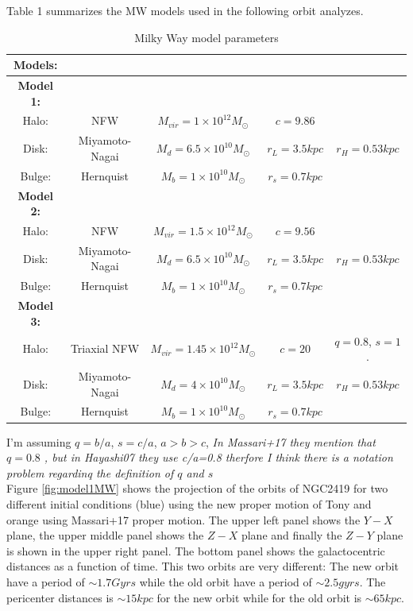\documentclass[14pt]{article}
\begin{document}
Table 1 summarizes the MW models used in the following orbit analyzes.

\begin{table}[H]
\centering
\begin{tabular}{c c c c c}
\hline
\hline
\textbf{Models:} & & & & \\
\hline
\textbf{Model 1:} & & & & \\
Halo: & NFW & $M_{vir} = 1\times 10^{12} M_{\odot}$ & $c=9.86$  \\
Disk: & Miyamoto-Nagai & $M_{d} = 6.5\times10^{10} M_{\odot}$ & $r_L = 3.5 kpc$ & $r_H = 0.53 kpc$ \\
Bulge: & Hernquist & $M_b = 1 \times 10^{10} M_{\odot}$ & $r_s=0.7 kpc$ & \\
\hline
\textbf{Model 2:} & & & & \\
Halo: & NFW & $M_{vir} = 1.5\times 10^{12} M_{\odot}$ & $c=9.56$  \\
Disk: & Miyamoto-Nagai & $M_{d} = 6.5\times10^{10} M_{\odot}$ & $r_L = 3.5 kpc$ & $r_H = 0.53 kpc$ \\
Bulge: & Hernquist & $M_b = 1 \times 10^{10} M_{\odot}$ & $r_s=0.7 kpc$ & \\
\hline
\textbf{Model 3:} & & & & \\
Halo: & Triaxial NFW & $M_{vir} = 1.45\times 10^{12} M_{\odot}$ &
$c=20$  & $q=0.8$, $s=1$. \\
Disk: & Miyamoto-Nagai & $M_{d} = 4\times10^{10} M_{\odot}$ & $r_L = 3.5 kpc$ & $r_H = 0.53 kpc$ \\
Bulge: & Hernquist & $M_b = 1 \times 10^{10} M_{\odot}$ & $r_s=0.7 kpc$ & \\
\hline
\hline
\end{tabular}
\caption{Milky Way model parameters}
\end{table}

I'm assuming $q=b/a$, $s=c/a$, $a>b>c$, \textit{In Massari+17 they
mention that $q=0.8$ , but in Hayashi07 they use c/a=0.8 therfore I
think there is a notation problem regardinq the definition of $q$ and
$s$ }\\

Figure \ref{fig:model1MW} shows the projection of the orbits of
NGC2419 for two different initial conditions (blue) using the new
proper motion of Tony and orange using Massari+17 proper motion.
The upper left panel shows the $Y-X$ plane, the upper middle panel
shows the $Z-X$ plane and finally the $Z-Y$ plane is shown in the
upper right panel. The bottom panel shows the galactocentric
distances as a function of time. This two orbits are very different:
The new orbit have a period of $\sim 1.7 Gyrs$ while the old orbit have a
period of $\sim 2.5 gyrs$. The pericenter distances is $\sim 15 kpc$
for the new orbit while for the old orbit is $\sim 65 kpc$.
\end{document}
